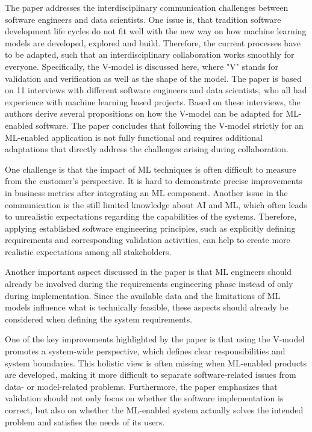 \documentclass[11pt]{article}
\begin{document}
The paper addresses the interdisciplinary communication challenges between software engineers and data scientists. One issue is, that tradition software development life cycles do not fit well with the new way on how machine learning models are developed, explored and build. Therefore, the current processes have to be adapted, such that an interdisciplinary collaboration works smoothly for everyone. Specifically, the V-model is discussed here, where "V" stands for validation and verification as well as the shape of the model. The paper is based on 11 interviews with different software engineers and data scientists, who all had experience with machine learning based projects. Based on these interviews, the authors derive several propositions on how the V-model can be adapted for ML-enabled software. The paper concludes that following the V-model strictly for an ML-enabled application is not fully functional and requires additional adaptations that directly address the challenges arising during collaboration.

One challenge is that the impact of ML techniques is often difficult to measure from the customer's perspective. It is hard to demonstrate precise improvements in business metrics after integrating an ML component.
Another issue in the communication is the still limited knowledge about AI and ML, which often leads to unrealistic expectations regarding the capabilities of the systems.
Therefore, applying established software engineering principles, such as explicitly defining requirements and corresponding validation activities, can help to create more realistic expectations among all stakeholders.

Another important aspect discussed in the paper is that ML engineers should already be involved during the requirements engineering phase instead of only during implementation. Since the available data and the limitations of ML models influence what is technically feasible, these aspects should already be considered when defining the system requirements.

One of the key improvements highlighted by the paper is that using the V-model promotes a system-wide perspective, which defines clear responsibilities and system boundaries. This holistic view is often missing when ML-enabled products are developed, making it more difficult to separate software-related issues from data- or model-related problems. Furthermore, the paper emphasizes that validation should not only focus on whether the software implementation is correct, but also on whether the ML-enabled system actually solves the intended problem and satisfies the needs of its users.
\end{document}
